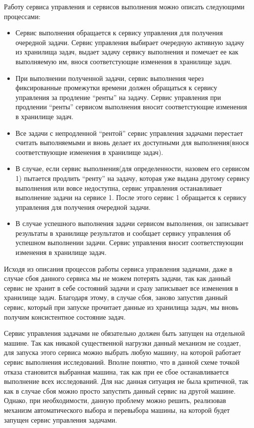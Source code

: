 \documentclass[12pt,a4paper]{extarticle}
\begin{document}
Работу сервиса управления и сервисов выполнения можно описать следующими процессами: 
\begin{itemize}
	\item Сервис выполнения обращается к сервису управления для получения очередной задачи. Сервис управления выбирает очередную активную задачу из хранилища задач, выдает задачу сервису выполнения и помечает ее как выполняемую им, внося соответстующие изменения в хранилище задач.
	\item При выполнении полученной задачи, сервис выполнения через фиксированные промежутки времени должен обращаться к сервису управления за продление ``ренты'' на задачу. Сервис управления при продлении ``ренты'' сервисом выполнения вносит соответстующие изменения в хранилище задач.
	\item Все задачи с непродленной ``рентой'' сервис управления задачами перестает считать выполняемыми и вновь делает их доступными для выполнения(внося соответствующие изменения в хранилище задач).
	\item В случае, если сервис выполнения(для определенности, назовем его сервисом 1) пытается продлить ``ренту'' на задачу, которая уже выдана другому сервису выполнения или вовсе недоступна, сервис управления останавливает выполнение задачи на сервисе 1. После этого сервис 1 обращается к сервису управления для получения очередной задачи.
	\item В случае успешного выполнения задачи сервисом выполнения, он записывает результаты в хранилище результатов и сообщает сервису управления об успешном выполнении задачи. Сервис управления вносит соответствующии изменения в хранилище задач.
\end{itemize}

Исходя из описания процессов работы сервиса управления задачами, даже в случае сбоя данного сервиса мы не можем потерять задачи, так как данный сервис не хранит в себе состояний задачи и сразу записывает все изменения в хранилище задач. Благодаря этому, в случае сбоя, заново запустив данный сервис, который при запуске прочитает данные из хранилища задач, мы вновь получим консистентное состояние задач.

Сервис управления задачами не обязательно должен быть запущен на отдельной машине. Так как никакой существенной нагрузки данный механизм не создает, для запуска этого сервиса можно выбрать любую машину, на которой работает сервис выполнения исследований. Вполне понятно, что в данной схеме точкой отказа становится выбранная машина, так как при ее сбое останавливается выполнение всех исследований. Для нас данная ситуация не была критичной, так как в случае сбоя можно просто запустить данный сервис на другой машине. Однако, при необходимости, данную проблему можно решить, реализовав механизм автоматического выбора и перевыбора машины, на которой будет запущен сервис управления задачами.
\end{document}
